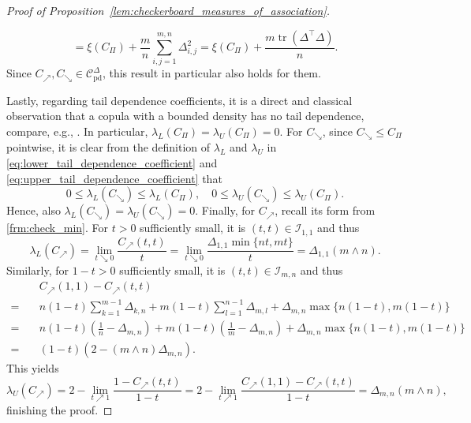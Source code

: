 \documentclass{article}
\theoremstyle{definition}
\newcommand{\CC}{\mathcal{C}}  %
\newcommand{\II}{\mathcal{I}}  %
\DeclareMathOperator{\tr}{tr}  %
\begin{document}
\begin{proof}[Proof of Proposition~\ref{lem:checkerboard_measures_of_association}]
\begin{enumerate}[label=(\roman*)]
\[            = \xi(C_{\Pi}) + \frac{m}n\sum_{i,j=1}^{m,n} \Delta_{i,j}^2
            = \xi(C_{\Pi}) + \frac{m\tr(\Delta^\top \Delta)}{n}
        .\]
        Since $C_{\nearrow}, C_{\searrow}\in \CC^{\Delta}_{\text{pd}}$, this result in particular also holds for them.
    \end{enumerate}    
    Lastly, regarding tail dependence coefficients, it is a direct and classical observation that a copula with a bounded density has no tail dependence, compare, e.g., \cite[below Remark 5.1]{mainik2015risk}.
    In particular, $\lambda_L(C_{\Pi}) = \lambda_U(C_{\Pi}) = 0$.
    For $C_{\searrow}$, since $C_{\searrow} \leq C_{\Pi}$ pointwise, it is clear from the definition of $\lambda_L$ and $\lambda_U$ in \eqref{eq:lower_tail_dependence_coefficient} and \eqref{eq:upper_tail_dependence_coefficient} that 
    \[
        0 \leq \lambda_L(C_{\searrow}) \leq \lambda_L(C_{\Pi}),
        \quad 0\leq \lambda_U(C_{\searrow}) \leq \lambda_U(C_{\Pi})
    .\]
    Hence, also $\lambda_L(C_{\searrow}) = \lambda_U(C_{\searrow}) = 0$.
    Finally, for $C_{\nearrow}$, recall its form from \eqref{frm:check_min}.
    For $t>0$ sufficiently small, it is $(t,t)\in\II_{1,1}$ and thus 
    \[
        \lambda_L(C_{\nearrow}) 
        = \lim_{t\searrow 0} \frac{C_{\nearrow}(t,t)}{t}
        = \lim_{t\searrow 0} \frac{\Delta_{1,1}\min\{nt, mt\}}{t}
        = \Delta_{1,1}(m\wedge n)
    .\]
    Similarly, for $1-t>0$ sufficiently small, it is $(t,t)\in\II_{m,n}$ and thus
    \begin{align*}
        & C_{\nearrow}(1,1) - C_{\nearrow}(t,t) \\
        = \quad & n(1-t)\sum_{k=1}^{m-1}\Delta_{k,n}+ m(1-t)\sum_{l=1}^{n-1}\Delta_{m,l} + \Delta_{m,n}\max\{n(1-t), m(1-t)\} \\
        = \quad & n(1-t)\left(\frac1n - \Delta_{m,n}\right) + m(1-t)\left(\frac1m - \Delta_{m,n}\right) + \Delta_{m,n}\max\{n(1-t), m(1-t)\} \\
        = \quad & (1-t)\left(2 - (m\wedge n)\Delta_{m,n}\right)
    .\end{align*}
    This yields
    \[
        \lambda_U(C_{\nearrow}) 
        = 2 - \lim_{t\nearrow 1} \frac{1 - C_{\nearrow}(t,t)}{1 - t}
        = 2 - \lim_{t\nearrow 1} \frac{C_{\nearrow}(1,1) - C_{\nearrow}(t,t)}{1 - t}
        = \Delta_{m,n}(m\wedge n)
    ,\]
    finishing the proof.
\end{proof}
\end{document}
